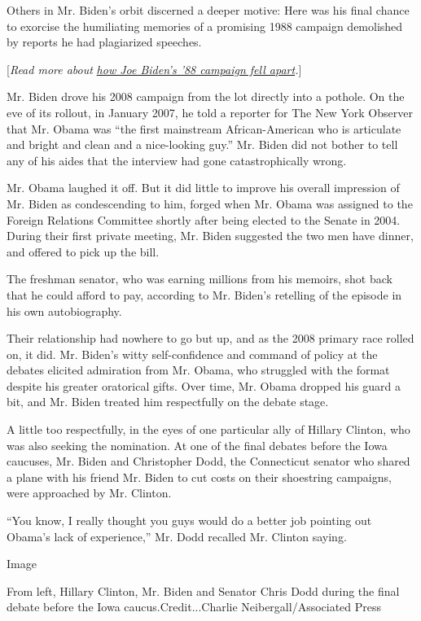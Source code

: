 Others in Mr. Biden's orbit discerned a deeper motive: Here was his
final chance to exorcise the humiliating memories of a promising 1988
campaign demolished by reports he had plagiarized speeches.

{[}\emph{Read more about}
\href{https://www.nytimes.com/2019/06/03/us/politics/biden-1988-presidential-campaign.html}{\emph{how
Joe Biden's '88 campaign fell apart}}\emph{.}{]}

Mr. Biden drove his 2008 campaign from the lot directly into a pothole.
On the eve of its rollout, in January 2007, he told a reporter for The
New York Observer that Mr. Obama was ``the first mainstream
African-American who is articulate and bright and clean and a
nice-looking guy.'' Mr. Biden did not bother to tell any of his aides
that the interview had gone catastrophically wrong.

Mr. Obama laughed it off. But it did little to improve his overall
impression of Mr. Biden as condescending to him, forged when Mr. Obama
was assigned to the Foreign Relations Committee shortly after being
elected to the Senate in 2004. During their first private meeting, Mr.
Biden suggested the two men have dinner, and offered to pick up the
bill.

The freshman senator, who was earning millions from his memoirs, shot
back that he could afford to pay, according to Mr. Biden's retelling of
the episode in his own autobiography.

Their relationship had nowhere to go but up, and as the 2008 primary
race rolled on, it did. Mr. Biden's witty self-confidence and command of
policy at the debates elicited admiration from Mr. Obama, who struggled
with the format despite his greater oratorical gifts. Over time, Mr.
Obama dropped his guard a bit, and Mr. Biden treated him respectfully on
the debate stage.

A little too respectfully, in the eyes of one particular ally of Hillary
Clinton, who was also seeking the nomination. At one of the final
debates before the Iowa caucuses, Mr. Biden and Christopher Dodd, the
Connecticut senator who shared a plane with his friend Mr. Biden to cut
costs on their shoestring campaigns, were approached by Mr. Clinton.

``You know, I really thought you guys would do a better job pointing out
Obama's lack of experience,'' Mr. Dodd recalled Mr. Clinton saying.

Image

From left, Hillary Clinton, Mr. Biden and Senator Chris Dodd during the
final debate before the Iowa caucus.Credit...Charlie
Neibergall/Associated Press

